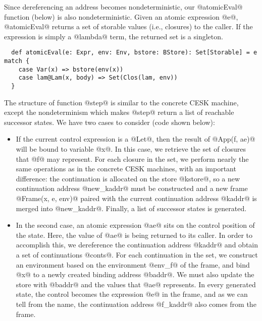 \documentclass[acmsmall, review]{acmart}\settopmatter{}
\begin{document}
Since dereferencing an address becomes nondeterministic, our @atomicEval@
function (below) is also nondeterministic. Given an atomic expression @e@,
@atomicEval@ returns a set of storable values (i.e., closures) to the caller.
If the expression is simply a @lambda@ term, the returned set is a singleton.

\begin{lstlisting}
  def atomicEval(e: Expr, env: Env, bstore: BStore): Set[Storable] = e match {
    case Var(x) => bstore(env(x))
    case lam@Lam(x, body) => Set(Clos(lam, env))
  }
\end{lstlisting}

The structure of function @step@ is similar to the concrete CESK machine,
except the nondeterminism which makes @step@ return a list of reachable successor states.
We have two cases to consider (code shown below):

\begin{itemize}
  \item If the current control expression is a @Let@, then the result of @App(f, ae)@ will 
    be bound to variable @x@. In this case, we retrieve the set of closures that @f@ may 
    represent. For each closure in the set, we perform nearly the same operations as in the
    concrete CESK machines, with an important difference: the continuation is allocated on 
    the store @kstore@, so a new continuation address @new_kaddr@ must be constructed and 
    a new frame @Frame(x, e, env)@ paired with the current continuation address @kaddr@ is 
    merged into @new_kaddr@. Finally, a list of successor states is generated.

  \item In the second case, an atomic expression @ae@ sits on the control position of the
    state. Here, the value of @ae@ is being returned to its caller.
    In order to accomplish this, we dereference the continuation address @kaddr@ and obtain 
    a set of continuations @conts@. For each continuation in the set, we construct an 
    environment based on the environment @env_f@ of the frame, and bind @x@ to a newly 
    created binding address @baddr@. We must also update the store with @baddr@ and the 
    values that @ae@ represents. In every generated state, the control becomes the expression 
    @e@ in the frame, and as we can tell from the name, the continuation address @f_kaddr@ 
    also comes from the frame.
\end{itemize}
\end{document}
